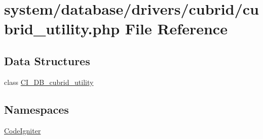 \hypertarget{cubrid__utility_8php}{\section{system/database/drivers/cubrid/cubrid\-\_\-utility.php File Reference}
\label{cubrid__utility_8php}
}
\subsection*{Data Structures}
\begin{DoxyCompactItemize}
\item 
class \hyperlink{class_c_i___d_b__cubrid__utility}{C\-I\-\_\-\-D\-B\-\_\-cubrid\-\_\-utility}
\end{DoxyCompactItemize}
\subsection*{Namespaces}
\begin{DoxyCompactItemize}
\item 
\hyperlink{namespace_code_igniter}{Code\-Igniter}
\end{DoxyCompactItemize}
